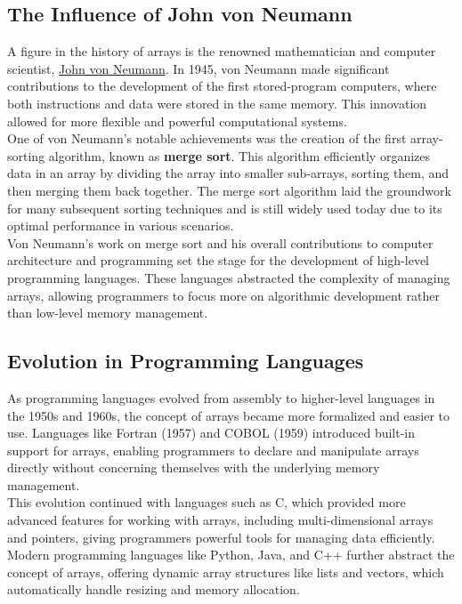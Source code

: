 \documentclass[12pt, oneside]{book}
\begin{document}
	\subsection{The Influence of John von Neumann}
A figure in the history of arrays is the renowned mathematician and computer scientist, \href{https://en.wikipedia.org/wiki/John_von_Neumann#Computer_science}{John von Neumann}. In 1945, von Neumann made significant contributions to the development of the first stored-program computers, where both instructions and data were stored in the same memory. This innovation allowed for more flexible and powerful computational systems.\\One of von Neumann's notable achievements was the creation of the first array-sorting algorithm, known as \textbf{merge sort}. This algorithm efficiently organizes data in an array by dividing the array into smaller sub-arrays, sorting them, and then merging them back together. The merge sort algorithm laid the groundwork for many subsequent sorting techniques and is still widely used today due to its optimal performance in various scenarios.\\Von Neumann’s work on merge sort and his overall contributions to computer architecture and programming set the stage for the development of high-level programming languages. These languages abstracted the complexity of managing arrays, allowing programmers to focus more on algorithmic development rather than low-level memory management.
	
	\subsection{Evolution in Programming Languages}
As programming languages evolved from assembly to higher-level languages in the 1950s and 1960s, the concept of arrays became more formalized and easier to use. Languages like Fortran (1957) and COBOL (1959) introduced built-in support for arrays, enabling programmers to declare and manipulate arrays directly without concerning themselves with the underlying memory management.\\This evolution continued with languages such as C, which provided more advanced features for working with arrays, including multi-dimensional arrays and pointers, giving programmers powerful tools for managing data efficiently. Modern programming languages like Python, Java, and C++ further abstract the concept of arrays, offering dynamic array structures like lists and vectors, which automatically handle resizing and memory allocation.
	
\end{document}
